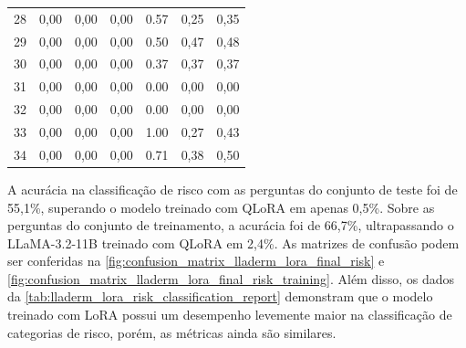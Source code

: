 \begin{table}[ht]
\begin{tabular}{l|c|c|c|c|c|c}
        28    & 0,00                                    & 0,00                                        & 0,00      &
        0.57  & 0,25                                    & 0,35                                                      \\
        29    & 0,00                                    & 0,00                                        & 0,00      &
        0.50  & 0,47                                    & 0,48                                                      \\
        30    & 0,00                                    & 0,00                                        & 0,00      &
        0.37  & 0,37                                    & 0,37                                                      \\
        31    & 0,00                                    & 0,00                                        & 0,00      &
        0.00  & 0,00                                    & 0,00                                                      \\
        32    & 0,00                                    & 0,00                                        & 0,00      &
        0.00  & 0,00                                    & 0,00                                                      \\
        33    & 0,00                                    & 0,00                                        & 0,00      &
        1.00  & 0,27                                    & 0,43                                                      \\
        34    & 0,00                                    & 0,00                                        & 0,00      &
        0.71  & 0,38                                    & 0,50                                                      \\
        \hline
    \end{tabular}
    \label{tab:lladerm_lora_skin_lesion_classification_report}
\end{table}

A acurácia na classificação de risco com as perguntas do conjunto de teste foi de 55,1\%, superando o modelo treinado
com \ac{QLoRA} em apenas 0,5\%. Sobre as perguntas do conjunto de treinamento, a acurácia foi de 66,7\%, ultrapassando
o \ac{LLaMA}-3.2-11B treinado com \ac{QLoRA} em 2,4\%. As matrizes de confusão podem ser conferidas na
\autoref{fig:confusion_matrix_lladerm_lora_final_risk} e
\autoref{fig:confusion_matrix_lladerm_lora_final_risk_training}. Além disso, os dados da
\autoref{tab:lladerm_lora_risk_classification_report} demonstram que o modelo treinado com \ac{LoRA} possui um
desempenho levemente maior na classificação de categorias de risco, porém, as métricas ainda são similares.


